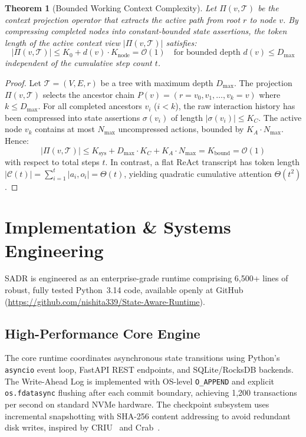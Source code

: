 \documentclass[10pt,journal,compsoc]{IEEEtran}
\newtheorem{theorem}{Theorem}
\begin{document}
\begin{theorem}[Bounded Working Context Complexity]
Let $\Pi(v, \mathcal{T})$ be the context projection operator that extracts the active path from root $r$ to node $v$. By compressing completed nodes into constant-bounded state assertions, the token length of the active context view $|\Pi(v, \mathcal{T})|$ satisfies:
\begin{equation}
|\Pi(v, \mathcal{T})| \le K_0 + d(v) \cdot K_{\text{node}} = \mathcal{O}(1) \quad \text{for bounded depth } d(v) \le D_{\max}
\end{equation}
independent of the cumulative step count $t$.
\end{theorem}

\begin{proof}
Let $\mathcal{T} = (V, E, r)$ be a tree with maximum depth $D_{\max}$. The projection $\Pi(v, \mathcal{T})$ selects the ancestor chain $P(v) = (r = v_0, v_1, \dots, v_k = v)$ where $k \le D_{\max}$. For all completed ancestors $v_i$ ($i < k$), the raw interaction history has been compressed into state assertions $\sigma(v_i)$ of length $|\sigma(v_i)| \le K_C$. The active node $v_k$ contains at most $N_{\max}$ uncompressed actions, bounded by $K_A \cdot N_{\max}$. Hence:
\begin{equation}
|\Pi(v, \mathcal{T})| \le K_{\text{sys}} + D_{\max} \cdot K_C + K_A \cdot N_{\max} = K_{\text{bound}} = \mathcal{O}(1)
\end{equation}
with respect to total steps $t$. In contrast, a flat ReAct transcript has token length $|\mathcal{C}(t)| = \sum_{i=1}^t |a_i, o_i| = \Theta(t)$, yielding quadratic cumulative attention $\Theta(t^2)$.
\end{proof}


\section{Implementation \& Systems Engineering}
SADR is engineered as an enterprise-grade runtime comprising 6,500+ lines of robust, fully tested Python~3.14 code, available openly at GitHub (\url{https://github.com/nishita339/State-Aware-Runtime}).

\subsection{High-Performance Core Engine}
The core runtime coordinates asynchronous state transitions using Python's \texttt{asyncio} event loop, FastAPI REST endpoints, and SQLite/RocksDB backends. The Write-Ahead Log is implemented with OS-level \texttt{O\_APPEND} and explicit \texttt{os.fdatasync} flushing after each commit boundary, achieving 1,200 transactions per second on standard NVMe hardware. The checkpoint subsystem uses incremental snapshotting with SHA-256 content addressing to avoid redundant disk writes, inspired by CRIU~\cite{price2016criu} and Crab~\cite{wu2026crab}.
\end{document}
